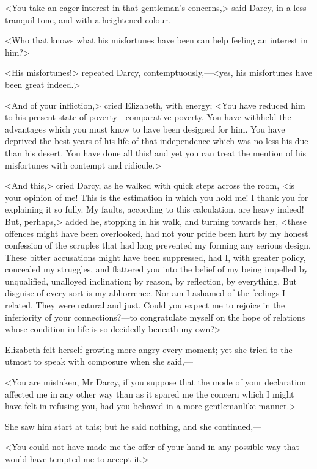 <You take an eager interest in that gentleman's concerns,> said Darcy, in a less tranquil tone, and with a heightened colour.

<Who that knows what his misfortunes have been can help feeling an interest in him?>

<His misfortunes!> repeated Darcy, contemptuously,—<yes, his misfortunes have been great indeed.>

<And of your infliction,> cried Elizabeth, with energy; <You have reduced him to his present state of poverty—comparative poverty. You have withheld the advantages which you must know to have been designed for him. You have deprived the best years of his life of that independence which was no less his due than his desert. You have done all this! and yet you can treat the mention of his misfortunes with contempt and ridicule.>

<And this,> cried Darcy, as he walked with quick steps across the room, <is your opinion of me! This is the estimation in which you hold me! I thank you for explaining it so fully. My faults, according to this calculation, are heavy indeed! But, perhaps,> added he, stopping in his walk, and turning towards her, <these offences might have been overlooked, had not your pride been hurt by my honest confession of the scruples that had long prevented my forming any serious design. These bitter accusations might have been suppressed, had I, with greater policy, concealed my struggles, and flattered you into the belief of my being impelled by unqualified, unalloyed inclination; by reason, by reflection, by everything. But disguise of every sort is my abhorrence. Nor am I ashamed of the feelings I related. They were natural and just. Could you expect me to rejoice in the inferiority of your connections?—to congratulate myself on the hope of relations whose condition in life is so decidedly beneath my own?>

Elizabeth felt herself growing more angry every moment; yet she tried to the utmost to speak with composure when she said,—

<You are mistaken, Mr Darcy, if you suppose that the mode of your declaration affected me in any other way than as it spared me the concern which I might have felt in refusing you, had you behaved in a more gentlemanlike manner.>

She saw him start at this; but he said nothing, and she continued,—

<You could not have made me the offer of your hand in any possible way that would have tempted me to accept it.>

